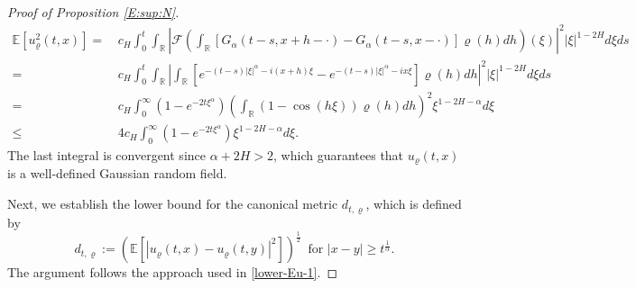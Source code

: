 \documentclass[11pt,reqno]{amsart}
\numberwithin{equation}{section}
\def\RR{\mathbb{R}}
\newcommand{\1}{{\bf 1}}
\newcommand{\2}{{\bf 2}}
\begin{document}
\begin{proof}[Proof of  Proposition \ref{E:sup:N}]
\begin{equation*}
\begin{split}
\mathbb E\left[u^2_{\varrho}(t,x) \right]
=&\, c_{H}\int_0^t \int_{\RR}\left| \mathcal F \left(\int_{\RR}[G_\alpha(t-s,x+h-\cdot)-G_\alpha(t-s,x-\cdot)]
 \varrho(h)dh \right)(\xi)\right|^2 |\xi|^{1-2H}d\xi ds\\
=&\, c_{H}\int_0^t \int_{\RR}\left| \int_{\RR}\left[
 e^{-(t-s)|\xi|^\alpha-i(x+h)\xi}-e^{-(t-s)|\xi|^\alpha-ix\xi} \right]\varrho(h)dh\right|^2|\xi|^{1-2H}d\xi ds\\
=&\, c_{H}\int_0^\infty\left(1-e^{-2t\xi^\alpha}\right)\left( \int_{\RR}(1-\cos(h\xi))\varrho(h)dh\right)^2
 \xi^{1-2H-\alpha}d\xi\\
\leq&\, 4c_{H}\int_0^\infty\left(1-e^{-2t\xi^\alpha}\right)\xi^{1-2H-\alpha}d\xi.
\end{split}
\end{equation*}
The last integral is   convergent since  $\alpha+2H>2$, which guarantees that   $u_{\varrho}(t,x)$ is a well-defined Gaussian random field.

Next, we establish the lower  bound for the canonical metric $d_{t,\varrho}$, which is  defined by
\begin{equation}
d_{t,\varrho}:=\left( \mathbb E\left[ \left|u_{\varrho}(t,x)-u_{\varrho}(t,y)\right|^2\right]\right)^{\frac12}  \, \text{ for  }  |x-y|\geq t^{\frac1\alpha}.
\end{equation}  
The argument follows the approach used  in \eqref{lower-Eu-1}. 


\end{proof}
\end{document}
